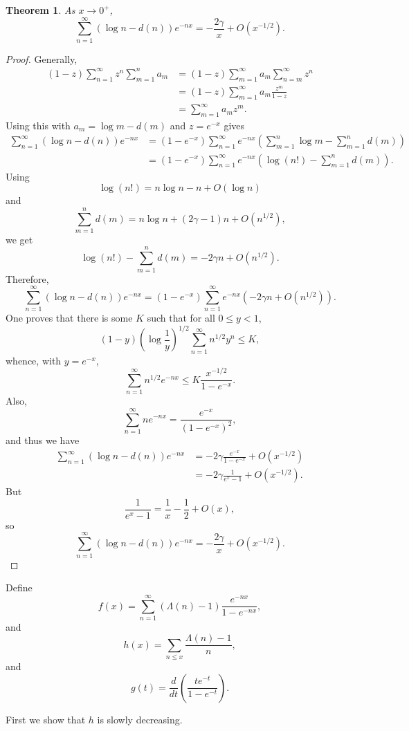 \documentclass{amsart}
\newtheorem{theorem}{Theorem}
\begin{document}
\begin{theorem}
As $x \to 0^+$,
\[
\sum_{n=1}^\infty (\log n  - d(n)) e^{-nx}=
 -\frac{2\gamma}{x} + O(x^{-1/2}).
\]
\label{logd}
\end{theorem}
\begin{proof}
Generally,
\begin{align*}
(1-z)\sum_{n=1}^\infty z^n \sum_{m=1}^n a_m&=
(1-z)\sum_{m=1}^\infty a_m \sum_{n=m}^\infty z^n\\
&=(1-z) \sum_{m=1}^\infty a_m \frac{z^m}{1-z}\\
&=\sum_{m=1}^\infty a_m z^m.
\end{align*}
Using this with $a_m = \log m-d(m)$ and $z=e^{-x}$ gives
\begin{align*}
\sum_{n=1}^\infty (\log n-d(n)) e^{-nx}&=
(1-e^{-x})\sum_{n=1}^\infty e^{-nx}\left( \sum_{m=1}^n \log m-\sum_{m=1}^n d(m) \right)\\
&=(1-e^{-x})\sum_{n=1}^\infty e^{-nx} \left( \log (n!) - \sum_{m=1}^n d(m) \right).
\end{align*}
Using
\[
\log(n!)  = n\log n -n + O(\log n)
\]
and
\[
\sum_{m=1}^n d(m) = n\log n + (2\gamma-1)n +O(n^{1/2}),
\]
we get
\[
\log(n!) - \sum_{m=1}^n d(m) = -2\gamma n + O(n^{1/2}).
\]
Therefore,
\[
\sum_{n=1}^\infty (\log n-d(n)) e^{-nx} =(1-e^{-x}) \sum_{n=1}^\infty e^{-nx}( -2\gamma n + O(n^{1/2})).
\]
One proves that there is some $K$ such that for all $0 \leq y < 1$,
\[
(1-y) \left( \log \frac{1}{y} \right)^{1/2} \sum_{n=1}^\infty n^{1/2} y^n \leq K,
\]
whence, with $y=e^{-x}$,
\[
\sum_{n=1}^\infty n^{1/2} e^{-nx} \leq K \frac{x^{-1/2}}{1-e^{-x}}.
\]
Also,
\[
\sum_{n=1}^\infty ne^{-nx} = \frac{e^{-x}}{(1-e^{-x})^2},
\]
and thus we have
\begin{align*}
\sum_{n=1}^\infty (\log n-d(n)) e^{-nx} &=-2\gamma \frac{e^{-x}}{1-e^{-x}}
+O(x^{-1/2})\\
&=-2\gamma \frac{1}{e^x-1} +O(x^{-1/2}).
\end{align*}
But
\[
\frac{1}{e^x-1}  = \frac{1}{x}-\frac{1}{2}+O(x),
\]
so 
\[
\sum_{n=1}^\infty (\log n-d(n)) e^{-nx} = -\frac{2\gamma}{x} + O(x^{-1/2}).
\]
\end{proof}



Define
\[
f(x) = \sum_{n=1}^\infty (\Lambda(n)-1) \frac{e^{-nx}}{1-e^{-nx}},
\]
and
\[
h(x) = \sum_{n \leq x} \frac{\Lambda(n)-1}{n},
\]
and
\[
g(t) = \frac{d}{dt} \left( \frac{te^{-t}}{1-e^{-t}} \right).
\]

First we show that $h$ is slowly decreasing.
\end{document}
